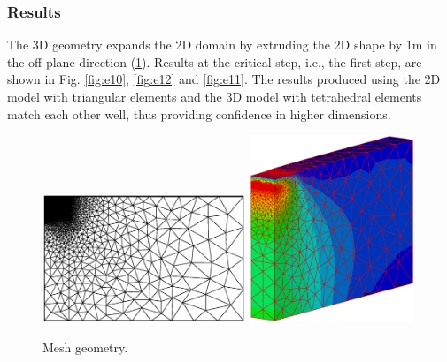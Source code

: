 \subsubsection*{Results}
The 3D geometry expands the 2D domain by extruding the 2D shape by 1m in the off-plane direction (\ref{fig_HM3}). Results at the critical step, i.e., the first step, are shown in Fig. \ref{fig:e10}, \ref{fig:e12} and  \ref{fig:e11}. The results produced using the 2D model with triangular elements and the 3D model with tetrahedral elements match each other well, thus providing confidence in higher dimensions.

\begin{figure}[!tbh]
\vspace{-1cm}
\begin{center}
\includegraphics[width=0.54\textwidth]{chapter_14/figures/fig_14_1_4_a}
\includegraphics[width=0.44\textwidth]{chapter_14/figures/fig_14_1_4_b}
\end{center}
\vspace{-0.5cm}
\caption{Mesh geometry.}
\label{fig_HM3}
\end{figure}

